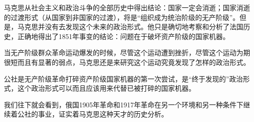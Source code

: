 马克思从社会主义和政治斗争的全部历史中得出结论：国家一定会消逝；国家消逝的过渡形式（从国家到非国家的过渡），将是“组织成为统治阶级的无产阶级”。但是，马克思并没有去{\kaishu 发现}这个未来的政治{\kaishu 形式}。他只是确切地考察和分析了法国历史，正确地得出了1851年事变的结论：问题在于{\kaishu 破坏}资产阶级的国家机器。

当无产阶级群众革命运动爆发的时候，尽管这个运动遭到挫折，尽管这个运动为期很短而且有显著的弱点，马克思还是来研究这个运动究竟{\kaishu 发现了}怎样的政治形式。

公社是无产阶级革命{\kaishu 打碎}资产阶级国家机器的第一次尝试，是“终于发现的”政治形式，这个政治形式可以而且应该用来{\kaishu 代替}已被打碎的国家机器。

我们往下就会看到，俄国1905年革命和1917年革命在另一个环境和另一种条件下继续着公社的事业，证实着马克思这种天才的历史分析。







